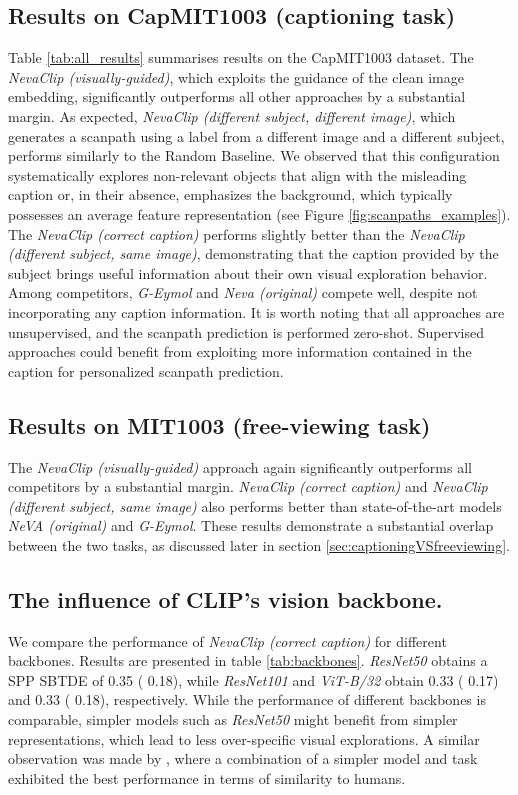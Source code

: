 \documentclass{article}
\begin{document}
\subsection{Results on CapMIT1003 (captioning task)}

Table \ref{tab:all_results} summarises results on the CapMIT1003 dataset. The \textit{NevaClip (visually-guided)}, which exploits the guidance of the clean image embedding, significantly outperforms all other approaches by a substantial margin. As expected, \textit{NevaClip (different subject, different image)}, which generates a scanpath using a label from a different image and a different subject, performs similarly to the Random Baseline. We observed that this configuration systematically explores non-relevant objects that align with the misleading caption or, in their absence, emphasizes the background, which typically possesses an average feature representation (see Figure \ref{fig:scanpaths_examples}). The \textit{NevaClip (correct caption)}  performs slightly better than the \textit{NevaClip (different subject, same image)}, demonstrating that the caption provided by the subject brings useful information about their own visual exploration behavior. Among competitors, \textit{G-Eymol} and \textit{Neva (original)} compete well, despite not incorporating any caption information. It is worth noting that all approaches are unsupervised, and the scanpath prediction is performed  zero-shot. Supervised approaches could benefit from exploiting more information contained in the caption for personalized scanpath prediction. 




\subsection{Results on MIT1003 (free-viewing task)}

The \textit{NevaClip (visually-guided)} approach again significantly outperforms all competitors by a substantial margin. \textit{NevaClip (correct caption)} and \textit{NevaClip (different subject, same image)} also performs better than state-of-the-art models \textit{NeVA (original)} and \textit{G-Eymol}. These results demonstrate a substantial overlap between the two tasks, as discussed later in section \ref{sec:captioningVSfreeviewing}. 

\subsection{The influence of CLIP's vision backbone.} We compare the performance of \textit{NevaClip (correct caption)} for different backbones. Results are presented in table \ref{tab:backbones}.  \textit{ResNet50} obtains a SPP SBTDE of 0.35 ( 0.18), while \textit{ResNet101} and \textit{ViT-B/32} obtain 0.33 ( 0.17) and 0.33 ( 0.18), respectively. While the performance of different backbones is comparable, simpler models such as \textit{ResNet50} might benefit from simpler representations, which lead to less over-specific visual explorations. A similar observation was made by  \citet{schwinn2022behind}, where a combination of a simpler model and task exhibited the best performance in terms of similarity to humans.
\end{document}
